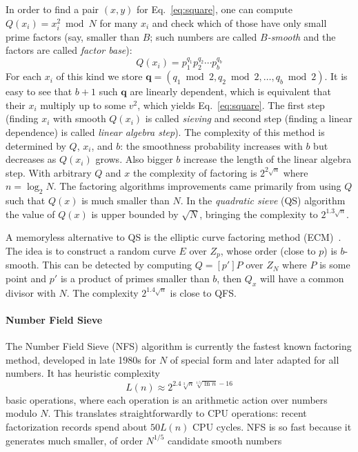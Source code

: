 \documentclass[a4paper]{article}
\begin{document}
In order to find a pair $(x,y)$ for Eq.~\eqref{eq:square}, one can compute $Q(x_i) = x_i^2\bmod{N}$ for many $x_i$ and check which of those have only small prime factors (say, smaller than $B$; such numbers are called \emph{$B$-smooth} and the factors are called \emph{factor base}): 
$$
Q(x_i) = p_1^{q_1}p_2^{q_2}\cdots p_b^{q_b}
$$For each $x_i$ of this kind we store $\mathbf{q}=(q_1 \bmod 2,q_2 \bmod 2,\ldots,q_b \bmod 2)$. It is easy to see that $b+1$ such $\mathbf{q}$ are linearly dependent, which is equivalent that their $x_i$ multiply up to some $v^2$, which yields Eq.~\eqref{eq:square}. The first step (finding $x_i$ with smooth $Q(x_i)$ is called \emph{sieving} and second step (finding a linear dependence) is called \emph{linear algebra step}).
The complexity of this method is determined by $Q$, $x_i$, and $b$: the smoothness probability increases with $b$ but decreases as $Q(x_i)$ grows. Also bigger $b$ increase the length of the linear algebra step. With arbitrary $Q$ and $x$ the complexity of factoring is $2^{2\sqrt{n}}$ where $n=\log_2 N$.  The factoring algorithms improvements came primarily from using $Q$ such that $Q(x)$ is much smaller than $N$. In the  \emph{quadratic  sieve} (QS) algorithm~\cite{DBLP:conf/eurocrypt/Pomerance84} the value of $Q(x)$ is upper bounded by $\sqrt{N}$, bringing the complexity to $2^{1.3\sqrt{n}}$. 

A memoryless alternative to QS is the elliptic curve factoring method (ECM)~\cite{lenstra1987factoring}. The idea is to construct a random curve $E$ over $Z_p$, whose order (close to $p$) is $b$-smooth. This can be detected by computing $Q=[p']P$ over $Z_N$ where $P$ is some point and $p'$ is a product of primes smaller than $b$, then $Q_x$ will have a common divisor with $N$. The complexity $2^{1.4\sqrt{n}}$ is close to QFS.

\paragraph{Number Field Sieve} The Number Field Sieve (NFS) algorithm is currently the fastest known factoring method, developed in late 1980s for $N$ of special form and later adapted for all numbers. It has heuristic complexity 
\begin{equation}\label{eq:sievecomp}
L(n) \approx 2^{2.4 \sqrt[3]{n}\sqrt[1.5]{\ln n}-16}
    \end{equation}
    basic operations, where each operation is an arithmetic action over numbers modulo $N$. This translates straightforwardly to CPU operations: recent factorization records spend about $50 L(n)$ CPU cycles. NFS is so fast because it generates much smaller, of order $N^{1/5}$ candidate smooth numbers
\end{document}
